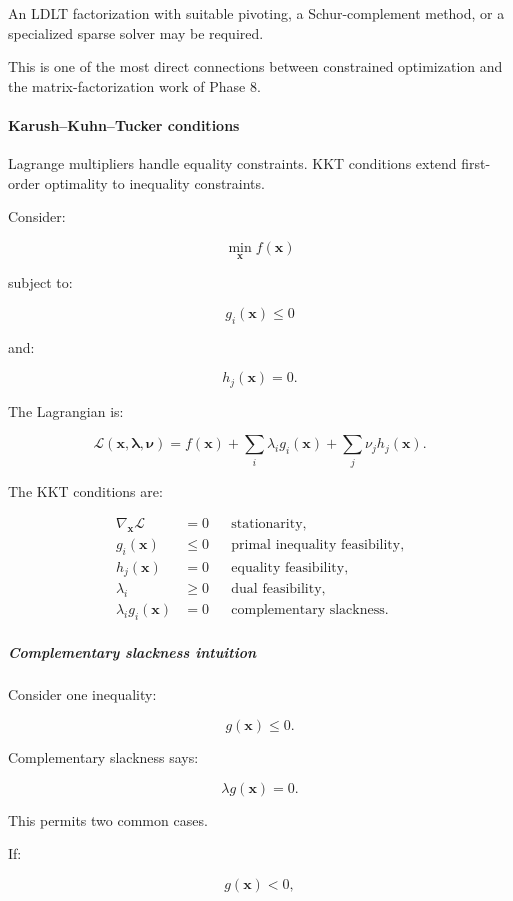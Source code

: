 An LDLT factorization with suitable pivoting, a Schur-complement method, or a specialized sparse solver may be required.

This is one of the most direct connections between constrained optimization and the matrix-factorization work of Phase 8.

\paragraph{Karush--Kuhn--Tucker conditions}\label{karushkuhntucker-conditions}

Lagrange multipliers handle equality constraints. KKT conditions extend first-order optimality to inequality constraints.

Consider:

\[
\min_{\mathbf x}f(\mathbf x)
\]

subject to:

\[
g_i(\mathbf x)\le0
\]

and:

\[
h_j(\mathbf x)=0.
\]

The Lagrangian is:

\[
\mathcal L(\mathbf x,\boldsymbol\lambda,\boldsymbol\nu) = f(\mathbf x)+ \sum_i\lambda_i g_i(\mathbf x)+ \sum_j\nu_jh_j(\mathbf x).
\]

The KKT conditions are:

\[
\boxed{ \begin{aligned} \nabla_{\mathbf x}\mathcal L&=0 &&\text{stationarity},\\ g_i(\mathbf x)&\le0 &&\text{primal inequality feasibility},\\ h_j(\mathbf x)&=0 &&\text{equality feasibility},\\ \lambda_i&\ge0 &&\text{dual feasibility},\\ \lambda_i g_i(\mathbf x)&=0 &&\text{complementary slackness}. \end{aligned} }
\]

\subparagraph{Complementary slackness intuition}\label{complementary-slackness-intuition}

Consider one inequality:

\[
g(\mathbf x)\le0.
\]

Complementary slackness says:

\[
\lambda g(\mathbf x)=0.
\]

This permits two common cases.

If:

\[
g(\mathbf x)<0,
\]

